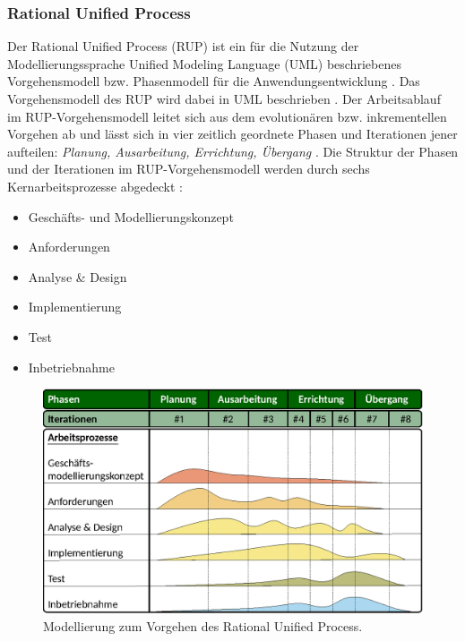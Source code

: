 \subsubsection{Rational Unified Process}
\label{sec3:model:subsubsec:rup}
Der Rational Unified Process (RUP) ist ein für die Nutzung der Modellierungssprache Unified Modeling Language (UML) beschriebenes Vorgehensmodell bzw. Phasenmodell für die Anwendungsentwicklung \cite{rup-inff}.
Das Vorgehensmodell des RUP wird dabei in UML beschrieben \cite{rup-inff}.
Der Arbeitsablauf im RUP-Vorgehensmodell leitet sich aus dem evolutionären bzw. inkrementellen Vorgehen ab und lässt sich in vier zeitlich geordnete Phasen und Iterationen jener aufteilen:
\textit{Planung, Ausarbeitung, Errichtung, Übergang} \cite{rup-inff}.
Die Struktur der Phasen und der Iterationen im RUP-Vorgehensmodell werden durch sechs Kernarbeitsprozesse abgedeckt \cite{rup-inff}:
\begin{itemize}
    \item Geschäfts- und Modellierungskonzept
    \item Anforderungen
    \item Analyse \& Design
    \item Implementierung
    \item Test
    \item Inbetriebnahme
\end{itemize}

\begin{figure}[htb]
    \centering
    \includegraphics{chapter/chapter_3/rup.eps}
    \caption{Modellierung zum Vorgehen des Rational Unified Process.}
    \label{sec3:model:subsec:conc-model-metho:fig:rup}
\end{figure}

